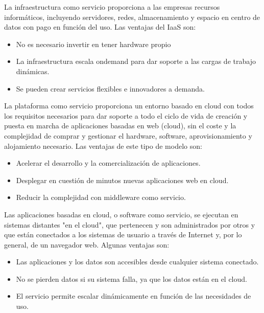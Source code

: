 La infraestructura como servicio proporciona a las empresas recursos informáticos, incluyendo servidores, redes, almacenamiento y espacio en centro de datos con pago en función del uso. Las ventajas del IaaS son:

\begin{itemize}
    \item No es necesario invertir en tener hardware propio
    \item La infraestructura escala ondemand para dar soporte a las cargas de trabajo dinámicas.
    \item Se pueden crear servicios flexibles e innovadores a demanda.
\end{itemize}

La plataforma como servicio proporciona un entorno basado en cloud con todos los requisitos necesarios para dar soporte a todo el ciclo de vida de creación y puesta en marcha de aplicaciones basadas en web (cloud), sin el coste y la complejidad de comprar y gestionar el hardware, software, aprovisionamiento y alojamiento necesario. Las ventajas de este tipo de modelo son:

\begin{itemize}
    \item Acelerar el desarrollo y la comercialización de aplicaciones.
    \item Desplegar en cuestión de minutos nuevas aplicaciones web en cloud.
    \item Reducir la complejidad con middleware como servicio.
\end{itemize}

Las aplicaciones basadas en cloud, o software como servicio, se ejecutan en sistemas distantes "en el cloud", que pertenecen y son administrados por otros y que están conectados a los sistemas de usuario a través de Internet y, por lo general, de un navegador web. Algunas ventajas son:

\begin{itemize}
    \item Las aplicaciones y los datos son accesibles desde cualquier sistema conectado.
    \item No se pierden datos si su sistema falla, ya que los datos están en el cloud.
    \item El servicio permite escalar dinámicamente en función de las necesidades de uso.
\end{itemize}


